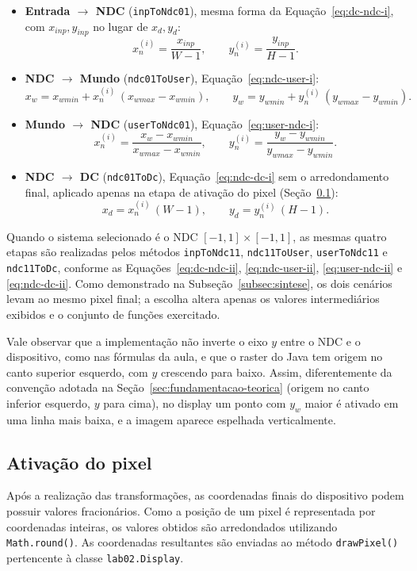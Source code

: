 \begin{itemize}
    \item \textbf{Entrada $\rightarrow$ NDC} (\texttt{inpToNdc01}), mesma forma da Equação~\eqref{eq:dc-ndc-i}, com $x_{inp}, y_{inp}$ no lugar de $x_d, y_d$:
    \[
        x_n^{(i)} = \frac{x_{inp}}{W-1}, \qquad y_n^{(i)} = \frac{y_{inp}}{H-1}.
    \]
    \item \textbf{NDC $\rightarrow$ Mundo} (\texttt{ndc01ToUser}), Equação~\eqref{eq:ndc-user-i}:
    \[
        x_w = x_{wmin} + x_n^{(i)} \, (x_{wmax} - x_{wmin}), \qquad
        y_w = y_{wmin} + y_n^{(i)} \, (y_{wmax} - y_{wmin}).
    \]
    \item \textbf{Mundo $\rightarrow$ NDC} (\texttt{userToNdc01}), Equação~\eqref{eq:user-ndc-i}:
    \[
        x_n^{(i)} = \frac{x_w - x_{wmin}}{x_{wmax} - x_{wmin}}, \qquad
        y_n^{(i)} = \frac{y_w - y_{wmin}}{y_{wmax} - y_{wmin}}.
    \]
    \item \textbf{NDC $\rightarrow$ DC} (\texttt{ndc01ToDc}), Equação~\eqref{eq:ndc-dc-i} sem o arredondamento final, aplicado apenas na etapa de ativação do pixel (Seção~\ref{subsec:ativacao-pixel}):
    \[
        x_d = x_n^{(i)} \, (W-1), \qquad y_d = y_n^{(i)} \, (H-1).
    \]
\end{itemize}

Quando o sistema selecionado é o NDC \mbox{$[-1,1] \times [-1,1]$}, as mesmas quatro etapas são realizadas pelos métodos \texttt{inpToNdc11}, \texttt{ndc11ToUser}, \texttt{userToNdc11} e \texttt{ndc11ToDc}, conforme as Equações~\eqref{eq:dc-ndc-ii}, \eqref{eq:ndc-user-ii}, \eqref{eq:user-ndc-ii} e \eqref{eq:ndc-dc-ii}. Como demonstrado na Subseção~\ref{subsec:sintese}, os dois cenários levam ao mesmo pixel final; a escolha altera apenas os valores intermediários exibidos e o conjunto de funções exercitado.

Vale observar que a implementação não inverte o eixo $y$ entre o NDC e o dispositivo, como nas fórmulas da aula, e que o raster do Java tem origem no canto superior esquerdo, com $y$ crescendo para baixo. Assim, diferentemente da convenção adotada na Seção~\ref{sec:fundamentacao-teorica} (origem no canto inferior esquerdo, $y$ para cima), no display um ponto com $y_w$ maior é ativado em uma linha mais baixa, e a imagem aparece espelhada verticalmente.

\subsection{Ativação do pixel}
\label{subsec:ativacao-pixel}
Após a realização das transformações, as coordenadas finais do dispositivo podem possuir valores fracionários. Como a posição de um pixel é representada por coordenadas inteiras, os valores obtidos são arredondados utilizando \texttt{Math.round()}. As coordenadas resultantes são enviadas ao método \texttt{drawPixel()} pertencente à classe \texttt{lab02.Display}.

